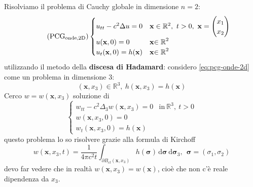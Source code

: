 \documentclass[10pt,a4paper,twoside,openright]{book}
\newcommand{\x}{\mathbf{x}}
\newcommand{\sigg}{\bm{\sigma}}
\newcommand{\de}{\,\mathrm d}
\newcommand{\dsig}{\de \sigg}
\begin{document}
Risolviamo il problema di Cauchy globale in dimensione $n=2$:
\begin{equation*}
	\tag{PCG$_{\text{onde,2D}}$}
	\begin{cases}
		u_{tt} -c^{2} \Delta u=0            & \x \in \mathbb{R}^{2} ,\ t >0,\ \x = 
		\begin{pmatrix}
		x_{1}\\
		x_{2}
		\end{pmatrix}\\
		u(\x ,0) =0                 & \x\mathbb{\in R}^{2}                         \\
		u_{t}(\x ,0) =h(\x) & \x\mathbb{\in R}^{2}                         
	\end{cases}
	\label{eq:pcg-onde-2d}
\end{equation*}
utilizzando il metodo della \textbf{discesa di Hadamard}: considero \eqref{eq:pcg-onde-2d} come un problema in dimensione $3$:
\begin{equation}
	(\x ,x_{3}) \in \mathbb{R}^{3} ,\ h(\x ,x_{3}) =h(\x)
\end{equation}
Cerco $\displaystyle w=w(\x ,x_{3})$ soluzione di
\begin{equation*}
	\begin{cases}
		w_{tt} -c^{2} \Delta _{3} w(\x ,x_{3}) =0 & \text{in} \ \mathbb{R}^{3} ,\ t >0 \\
		w(\x ,x_{3} ,0) =0                        &                                    \\
		w_{t}(\x ,x_{3} ,0) =h(\x)        &                                    
	\end{cases}
\end{equation*}
questo problema lo so risolvere grazie alla formula di Kirchoff
\begin{equation*}
	w(\x ,x_{3} ,t) =\frac{1}{4\pi c^{2} t}\int _{\partial B_{ct}(\x ,x_{3})} h(\sigg) \dsig \dsig _{3} ,\ \ \sigg =(\sigma _{1} ,\sigma _{2})
\end{equation*}
devo far vedere che in realtà $\displaystyle w(\x ,x_{3}) =w(\x)$, cioè che non c'è reale dipendenza da $\displaystyle x_{3}$.
\end{document}
